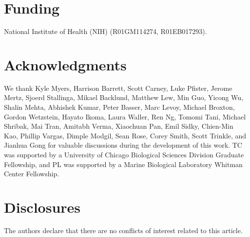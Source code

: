 \documentclass[]{osa-article}
\begin{document}
\section*{Funding}
National Institute of Health (NIH) (R01GM114274, R01EB017293).

\section*{Acknowledgments}
We thank Kyle Myers, Harrison Barrett, Scott Carney, Luke Pfister, Jerome Mertz,
Sjoerd Stallinga, Mikael Backlund, Matthew Lew, Min Guo, Yicong Wu, Shalin
Mehta, Abhishek Kumar, Peter Basser, Marc Levoy, Michael Broxton, Gordon
Wetzstein, Hayato Ikoma, Laura Waller, Ren Ng, Tomomi Tani, Michael Shribak, Mai
Tran, Amitabh Verma, Xiaochuan Pan, Emil Sidky, Chien-Min Kao, Phillip Vargas,
Dimple Modgil, Sean Rose, Corey Smith, Scott Trinkle, and Jianhua Gong for
valuable discussions during the development of this work. TC was supported by a
University of Chicago Biological Sciences Division Graduate Fellowship, and PL
was supported by a Marine Biological Laboratory Whitman Center Fellowship.

\section*{Disclosures}
The authors declare that there are no conflicts of interest related to this article.


\appendix
\end{document}
